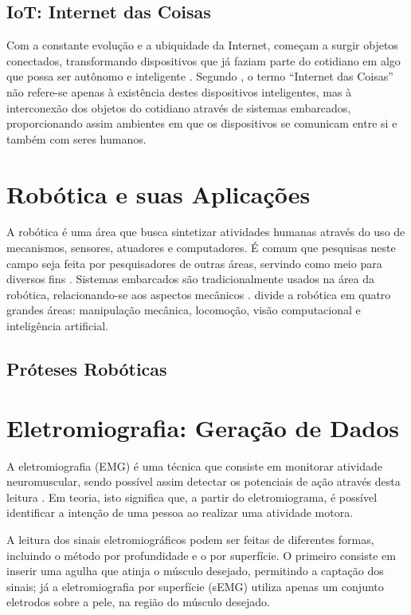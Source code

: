 \subsection{IoT: Internet das Coisas}
Com a constante evolução e a ubiquidade da Internet, começam a surgir objetos conectados, transformando dispositivos que já faziam parte do cotidiano em algo que possa ser autônomo e inteligente \cite{kopetz:2011}.  Segundo , o termo ``Internet das Coisas''  não refere-se apenas à existência destes dispositivos inteligentes, mas à interconexão dos objetos do cotidiano através de sistemas embarcados, proporcionando assim ambientes em que os dispositivos se comunicam entre si e também com seres humanos.

\section{Robótica e suas Aplicações}
A robótica é uma área que busca sintetizar atividades humanas através do uso de mecanismos, sensores, atuadores e computadores. É comum que pesquisas neste campo seja feita por pesquisadores de outras áreas, servindo como meio para diversos fins \cite{craig:2005}. Sistemas embarcados são tradicionalmente usados na área da robótica, relacionando-se aos aspectos mecânicos \cite{marwedel:2010}.  divide a robótica em quatro grandes áreas: manipulação mecânica, locomoção, visão computacional e inteligência artificial.
\label{sec:robotica}
\subsection{Próteses Robóticas}

\section{Eletromiografia: Geração de Dados}
\label{sec:emg}
A eletromiografia (EMG) é uma técnica que consiste em monitorar atividade neuromuscular, sendo possível assim detectar os potenciais de ação através desta leitura \cite{lee:1984}. Em teoria, isto significa que, a partir do eletromiograma, é possível identificar a intenção de uma pessoa ao realizar uma atividade motora.

A leitura dos sinais eletromiográficos podem ser feitas de diferentes formas, incluindo o método por profundidade e o por superfície. O primeiro consiste em inserir uma agulha que atinja o músculo desejado, permitindo a captação dos sinais; já a eletromiografia por superfície (sEMG) utiliza apenas um conjunto eletrodos sobre a pele, na região do músculo desejado.

